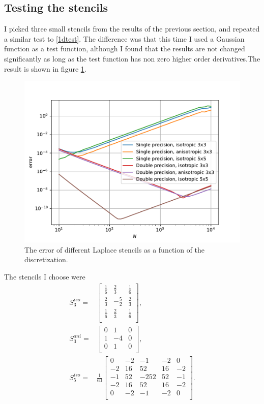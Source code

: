 \documentclass[pdftex,12pt,a4paper]{article}
\begin{document}
	\subsection{Testing the stencils}
		I picked three small stencils from the results of the previous section, and repeated a similar test to \ref{1dtest}. The difference was that this time I used a Gaussian function as a test function, although I found that the results are not changed significantly as long as the test function has non zero higher order derivatives.The result is shown in figure \ref{2dpdf}.
		\begin{figure}[H]
			\centering
			\includegraphics[scale=1]{./figs/2d.pdf}
			\caption{The error of different Laplace stencils as a function of the discretization.}
			\label{2dpdf}
		\end{figure}
		The stencils I choose were
		\begin{equation}
			\begin{aligned}
			S_3^{iso} =& 
				\begin{bmatrix}
					\frac{1}{6} & \frac{2}{3} & \frac{1}{6}\\
					\frac{2}{3} & -\frac{5}{2} & \frac{2}{3}\\
					\frac{1}{6} & \frac{2}{3} & \frac{1}{6}\\
				\end{bmatrix},\\
			S_3^{ani} =&
				\begin{bmatrix}
					0 & 1 & 0\\
					1 & -4 & 0\\
					0 & 1 & 0\\
				\end{bmatrix},\\
			S_5^{iso} =& \frac{1}{60}
				\begin{bmatrix}
					0 & -2 & -1 & -2 & 0\\
					-2 & 16 & 52 & 16 & -2\\
					-1 & 52 & -252 & 52 & -1\\
					-2 & 16 & 52 & 16 & -2\\
					0 & -2 & -1 & -2 & 0\\
				\end{bmatrix}.\\
			\end{aligned}
		\end{equation}
\end{document}
